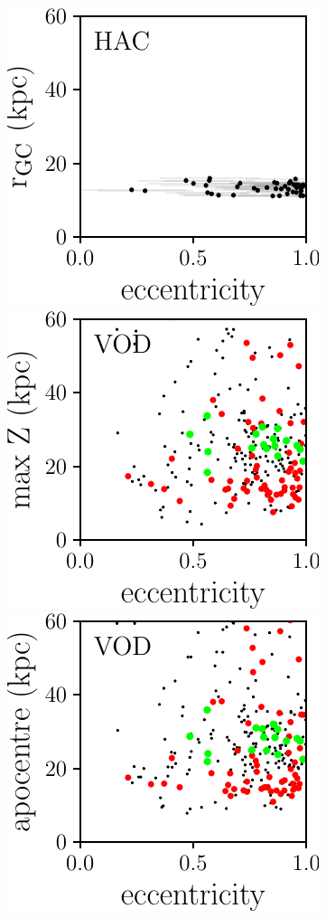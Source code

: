 \documentclass[fleqn,usenatbib]{mnras}
\begin{document}
\begin{figure}
  \includegraphics[scale=0.473]{HAC_orbits_ecc_r.pdf} 
	\includegraphics[scale=0.473]{VOD_orbits_ecc_z.pdf}
    \includegraphics[scale=0.473]{VOD_orbits_apo_ecc.pdf} 

\end{figure}
\end{document}
